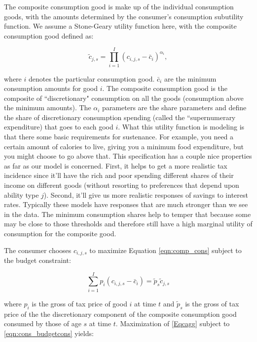 \documentclass[letterpaper,12pt]{article}
\theoremstyle{definition}
\begin{document}
\begin{spacing}{1.5}
  The composite consumption good is make up of the individual consumption goods, with the amounts determined by the consumer's consumption subutility function.  We assume a Stone-Geary utility function here, with the composite consumption good defined as: 
  
  \begin{equation} \label{eqn:comp_cons}
\tilde{c}_{j,s}  = \prod_{i=1}^I \left( c_{i,j,s} - \bar{c}_{i} \right) ^{\alpha_{i}}, 
 \end{equation}
 
 \noindent\noindent where $i$ denotes the particular consumption good.  $\bar{c}_{i}$ are the minimum consumption amounts for good $i$.  The composite consumption good is the composite of ``discretionary" consumption on all the goods (consumption above the minimum amounts).  The $\alpha_{i}$ parameters are the share parameters and define the share of discretionary consumption spending (called the ``supernumerary expenditure) that goes to each good $i$.  What this utility function is modeling is that there some basic requirements for sustenance.  For example, you need a certain amount of calories to live, giving you a minimum food expenditure, but you might choose to go above that.  This specification has a couple nice properties as far as our model is concerned.  First, it helps to get a more realistic tax incidence since it'll have the rich and poor spending different shares of their income on different goods (without resorting to preferences that depend upon ability type $j$).  Second, it'll give us more realistic responses of savings to interest rates.  Typically these models have responses that are much stronger than we see in the data.  The minimum consumption shares help to temper that because some may be close to those thresholds and therefore still have a high marginal utility of consumption for the composite good.
 
The consumer chooses $c_{i,j,s}$ to maximize Equation \ref{eqn:comp_cons} subject to the budget constraint:

    \begin{equation} \label{eqn:cons_budgetcons}
        \sum_{i=1}^{I} p_{i}(c_{i,j,s}-\bar{c}_{i})  = \tilde{p}_{s}\tilde{c}_{j,s}
    \end{equation}

\noindent where $p_{i}$ is the gross of tax price of good $i$ at time $t$ and $\tilde{p}_{s}$ is the gross of tax price of the the discretionary component of the composite consumption good consumed by those of age $s$ at time $t$.  Maximization of \ref{Eqcagg} subject to \ref{eqn:cons_budgetcons} yields:


\end{spacing}
\end{document}
